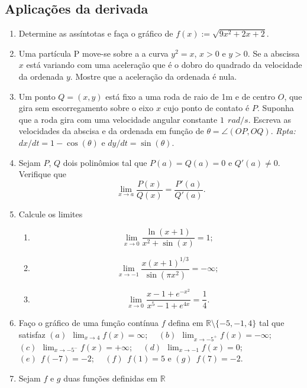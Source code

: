 \documentclass[latin,20pt]{article}
\begin{document}
    \subsection{Aplicações da derivada}
     \begin{enumerate}
     \item Determine as assíntotas e faça o gráfico de 
     $f(x):=\sqrt{9x^{2}+2x+2}$.
     \item Uma partícula P move-se sobre a a curva 
     $y^{2}=x$, $x>0$ e $y>0$. Se a abscissa $x$ 
     está variando com uma aceleração que é o dobro 
     do quadrado da velocidade da ordenada $y$. 
     Mostre que a aceleração da ordenada é nula. 
     \item Um ponto $Q=(x,y)$ está fixo a uma roda 
     de raio de 1m e de centro $O$, que gira 
     sem escorregamento sobre o eixo $x$ cujo ponto de contato é $P$. 
     Suponha que a roda gira com uma velocidade angular 
     constante $1 \ \ rad/s$. 
     Escreva as velocidades da abscisa e da 
     ordenada em função de $\theta=\angle (OP, OQ)$. 
     {\it Rpta: } $dx/dt=1-\cos(\theta)$ e 
     $dy/dt=\sin(\theta)$.
      \item Sejam $P$, $Q$ dois polinômios tal que 
      $P(a)=Q(a)=0$
      e $Q'(a)\neq 0$. Verifique que 
      $$   \lim_{x \rightarrow a}\frac{P(x)}{Q(x)}=
      \frac{P'(a)}{Q'(a)}.$$
      \item Calcule os limites
        \begin{enumerate}
        \item 
        $$ \lim_{x \rightarrow 0} 
        \frac{\ln(x+1)}{x^2+\sin(x)}=1; $$
        \item 
        $$ \lim_{x \rightarrow -1} 
        \frac{x(x+1)^{1/3}}{\sin(\pi x^2)}=-\infty; $$
        \item 
        $$ \lim_{x \rightarrow 0} 
        \frac{x-1+e^{-x^2}}{x^5-1+e^{4x}}=\frac{1}{4}. $$
        \end{enumerate} 
      \item Faço o gráfico de uma função contínua $f$ defina em 
      $\mathbb{R}\setminus\{-5,-1,4\}$ tal que satisfaz
      $(a) \ \  \lim_{x \rightarrow 4} f(x)=\infty$; \ \  
      $(b) \ \ \lim_{x \rightarrow -5^{+}} f(x)=-\infty$; \ \ 
      $(c) \ \ \lim_{x \rightarrow -5^{-}} f(x)=+\infty$; \ \ 
      $(d) \ \ \lim_{x \rightarrow -1} f(x)=0$; \ \ 
      $(e) \ \ f(-7)=-2$; \ \ 
      $(f) \ \ f(1)=5$ e 
      $(g) \ \ f(7)=-2$.
      \item Sejam $f$ e $g$ duas funções definidas em $\mathbb{R}$

\end{enumerate}
\end{document}

